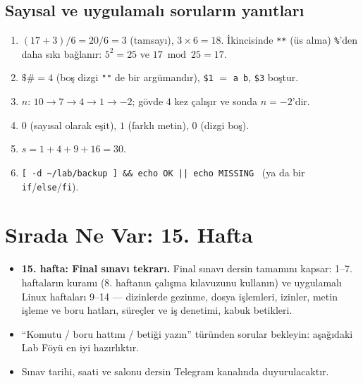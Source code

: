\subsection*{Sayısal ve uygulamalı soruların yanıtları}
\begin{enumerate}[leftmargin=1.6em,start=9]
  \item $(17+3)/6 = 20/6 = 3$ (tamsayı), $3 \times 6 = 18$. İkincisinde \texttt{**} (üs alma) \texttt{\%}'den daha sıkı bağlanır: $5^2 = 25$ ve $17 \bmod 25 = 17$.
  \item $\$\# = 4$ (boş dizgi \texttt{""} de bir argümandır), \texttt{\$1} $=$ \texttt{a b}, \texttt{\$3} boştur.
  \item $n$: $10 \to 7 \to 4 \to 1 \to -2$; gövde $4$ kez çalışır ve sonda $n = -2$'dir.
  \item $0$ (sayısal olarak eşit), $1$ (farklı metin), $0$ (dizgi boş).
  \item $s = 1 + 4 + 9 + 16 = 30$.
  \item \texttt{[ -d \textasciitilde/lab/backup ] \&\& echo OK || echo MISSING} \ (ya da bir \texttt{if}/\texttt{else}/\texttt{fi}).
\end{enumerate}

\section{Sırada Ne Var: 15. Hafta}

\begin{itemize}
  \item \textbf{15. hafta: Final sınavı tekrarı.} Final sınavı dersin tamamını kapsar: 1--7. haftaların kuramı (8. haftanın çalışma kılavuzunu kullanın) ve uygulamalı Linux haftaları 9--14 --- dizinlerde gezinme, dosya işlemleri, izinler, metin işleme ve boru hatları, süreçler ve iş denetimi, kabuk betikleri.
  \item “Komutu / boru hattını / betiği yazın” türünden sorular bekleyin: aşağıdaki Lab Föyü en iyi hazırlıktır.
  \item Sınav tarihi, saati ve salonu dersin Telegram kanalında duyurulacaktır.
\end{itemize}

